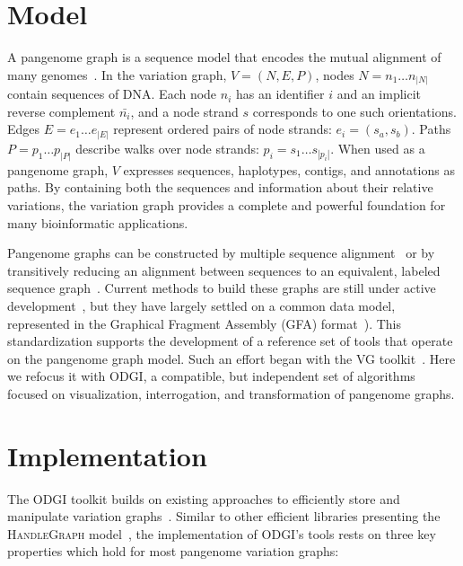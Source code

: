 \documentclass{bioinfo}
\newcommand{\red}[1]{{\textcolor{Red}{#1}}}
\newcommand{\FIXME}[1]{\red{[FIXME: #1]}}
\begin{document}
\section{Model}
A pangenome graph is a sequence model that encodes the mutual alignment of many genomes~\citep{Garrison_2019_thesis,Eizenga_2020}.
In the variation graph, $V = (N, E, P)$, nodes $N = n_1\ldots n_{|N|}$ contain sequences of DNA.
Each node $n_i$ has an identifier $i$ and an implicit reverse complement $\bar{n_i}$, and a node strand $s$ corresponds to one such orientations.
Edges $E = e_1\ldots e_{|E|}$ represent ordered pairs of node strands: $e_i = ( s_a, s_b )$.
Paths $P = p_1\ldots p_{|P|}$ describe walks over node strands: $p_i = s_1 \ldots s_{|p_i|}$.
When used as a pangenome graph, $V$ expresses sequences, haplotypes, contigs, and annotations as paths.
By containing both the sequences and information about their relative variations, the variation graph provides a complete and powerful foundation for many bioinformatic applications.

Pangenome graphs can be constructed by multiple sequence alignment~\citep{Lee_2002,Grasso_2004} or by transitively reducing an alignment between sequences to an equivalent, labeled sequence graph~\citep{Kehr_2014,Garrison_2019_thesis}.
Current methods to build these graphs are still under active development~\citep{Li:2020,Armstrong:2020,pggb}, but they have largely settled on a common data model, represented in the Graphical Fragment Assembly (GFA) format~\citep{GFA}).
This standardization supports the development of a reference set of tools that operate on the pangenome graph model.
Such an effort began with the VG toolkit~\citep{Garrison:2018}.
Here we refocus it with ODGI, a compatible, but independent set of algorithms focused on visualization, interrogation, and transformation of pangenome graphs.


\section{Implementation}
The ODGI toolkit builds on existing approaches to efficiently store and manipulate variation graphs~\citep{Garrison:2018}.
Similar to other efficient libraries presenting the \textsc{HandleGraph} model~\citep{Eizenga_2020_BX}, the implementation of ODGI's tools rests on three key properties which hold for most pangenome variation graphs:
\end{document}
